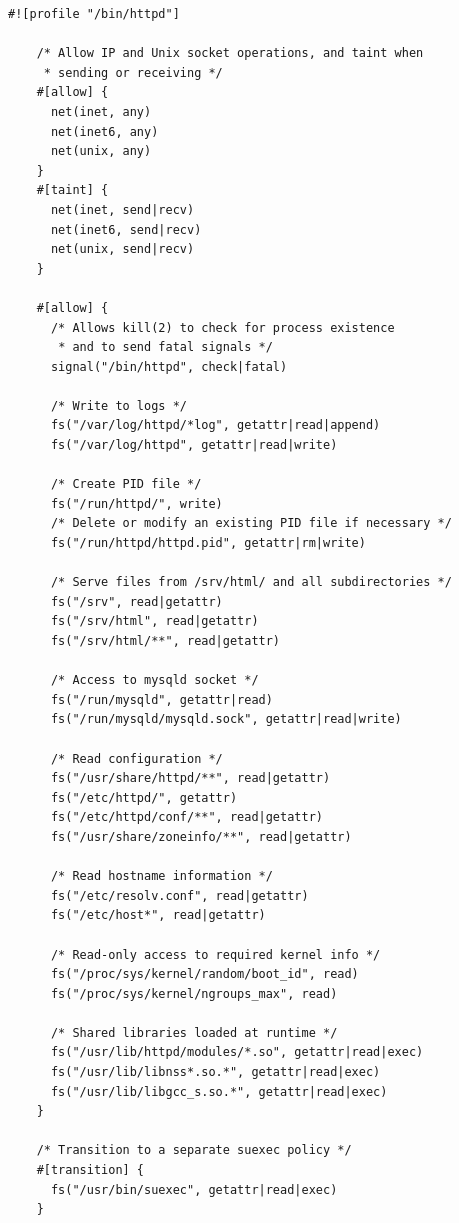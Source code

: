 \documentclass[
  fontsize=12pt,
  titlepage=firstiscover,
  paper=letter,
oneside,
  cleardoublepage=plain,
  parskip=half-,
  DIV=10,
  parindent,
  appendixprefix,
  chapterprefix,
  listof=totoc,
]{scrbook}
\newcommand{\bpfbox}{\textsc{BPFBox}}
\begin{document}
\begin{lstlisting}[language=bpfbox, gobble=4, float=false, caption={[A \bpfbox{} policy for Apache httpd]
  A \bpfbox{} policy for Apache httpd.
}, label={lst:bpfbox-apache}]
    #![profile "/bin/httpd"]

    /* Allow IP and Unix socket operations, and taint when
     * sending or receiving */
    #[allow] {
      net(inet, any)
      net(inet6, any)
      net(unix, any)
    }
    #[taint] {
      net(inet, send|recv)
      net(inet6, send|recv)
      net(unix, send|recv)
    }

    #[allow] {
      /* Allows kill(2) to check for process existence
       * and to send fatal signals */
      signal("/bin/httpd", check|fatal)

      /* Write to logs */
      fs("/var/log/httpd/*log", getattr|read|append)
      fs("/var/log/httpd", getattr|read|write)

      /* Create PID file */
      fs("/run/httpd/", write)
      /* Delete or modify an existing PID file if necessary */
      fs("/run/httpd/httpd.pid", getattr|rm|write)

      /* Serve files from /srv/html/ and all subdirectories */
      fs("/srv", read|getattr)
      fs("/srv/html", read|getattr)
      fs("/srv/html/**", read|getattr)

      /* Access to mysqld socket */
      fs("/run/mysqld", getattr|read)
      fs("/run/mysqld/mysqld.sock", getattr|read|write)

      /* Read configuration */
      fs("/usr/share/httpd/**", read|getattr)
      fs("/etc/httpd/", getattr)
      fs("/etc/httpd/conf/**", read|getattr)
      fs("/usr/share/zoneinfo/**", read|getattr)

      /* Read hostname information */
      fs("/etc/resolv.conf", read|getattr)
      fs("/etc/host*", read|getattr)

      /* Read-only access to required kernel info */
      fs("/proc/sys/kernel/random/boot_id", read)
      fs("/proc/sys/kernel/ngroups_max", read)

      /* Shared libraries loaded at runtime */
      fs("/usr/lib/httpd/modules/*.so", getattr|read|exec)
      fs("/usr/lib/libnss*.so.*", getattr|read|exec)
      fs("/usr/lib/libgcc_s.so.*", getattr|read|exec)
    }

    /* Transition to a separate suexec policy */
    #[transition] {
      fs("/usr/bin/suexec", getattr|read|exec)
    }
\end{lstlisting}
\end{document}

